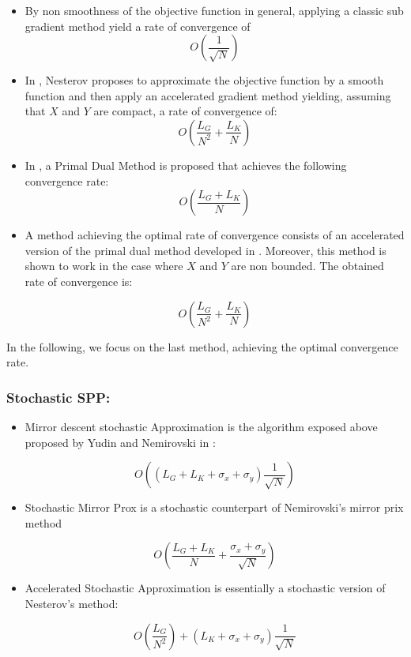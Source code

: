 \documentclass[12pt,reqno]{amsart}
\numberwithin{equation}{section}
\begin{document}
\begin{itemize}

\item By non smoothness of the objective function in general, applying a classic sub gradient method \cite{YudinNemirovski} yield a rate of convergence of
$$
O(\dfrac{1}{\sqrt{N}})
$$

\item In \cite{Nesterov}, Nesterov proposes to approximate the objective function by a smooth function and then apply an accelerated gradient method yielding, assuming that $X$ and $Y$ are compact, a rate of convergence of:
$$
O(\dfrac{L_{G}}{N^2} + \dfrac{L_{K}}{N})
$$

\item In \cite{ChambollePock}, a Primal Dual Method is proposed that achieves the following convergence rate:
$$
O(\dfrac{L_{G} + L_{K}}{N})
$$
\item A method achieving the optimal rate of convergence consists of an accelerated version of the primal dual method developed in \cite{ChenLanOuyang}.
Moreover, this method is shown to work in the case where $X$ and $Y$ are non bounded.
The obtained rate of convergence is:

$$
O(\dfrac{L_{G}}{N^2} + \dfrac{L_{K}}{N})
$$


\end{itemize}

In the following, we focus on the last method, achieving the optimal convergence rate.

%




\subsubsection{ Stochastic SPP: }
\begin{itemize}
\item Mirror descent stochastic Approximation is the algorithm exposed above proposed by Yudin and Nemirovski in \cite{YudinNemirovski}:

$$
O((L_{G} + L_{K} + \sigma_{x} + \sigma_{y})\dfrac{1}{\sqrt{N}})
$$

\item Stochastic Mirror Prox is a stochastic counterpart of Nemirovski's mirror prix method

$$
O(\dfrac{L_{G} + L_{K}}{N} + \dfrac{\sigma_{x} + \sigma_{y}}{\sqrt{N}})
$$

\item Accelerated Stochastic Approximation is essentially a stochastic version of Nesterov's method:

$$
O(\dfrac{L_{G}}{N^{2}}) + (L_{K} + \sigma_{x} + \sigma_{y})\dfrac{1}{\sqrt{N}}
$$
\end{itemize}
\end{document}
